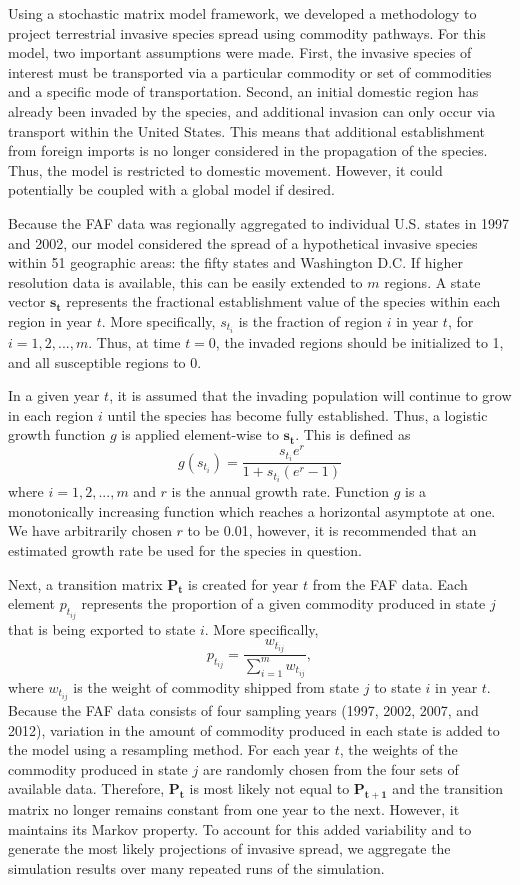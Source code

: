 \documentclass[12pt]{article}
\begin{document}
Using a stochastic matrix model framework, we developed a methodology to project terrestrial invasive species spread using commodity pathways.  For this model, two important assumptions were made.  First, the invasive species of interest must be transported via a particular commodity or set of commodities and a specific mode of transportation.  Second, an initial domestic region has already been invaded by the species, and additional invasion can only occur via transport within the United States.  This means that additional establishment from foreign imports is no longer considered in the propagation of the species.  Thus, the model is restricted to domestic movement. However, it could potentially be coupled with a global model if desired.

Because the FAF data was regionally aggregated to individual U.S. states in 1997 and 2002, our model considered the spread of a hypothetical invasive species within 51 geographic areas: the fifty states and Washington D.C.  If higher resolution data is available, this can be easily extended to $m$ regions.  A state vector $\boldsymbol{s_t}$ represents the fractional establishment value of the species within each region in year $t$.  More specifically, $s_{t_i}$ is the fraction of region $i$ in year $t$, for $i = 1,2,..., m$.  Thus, at time $t=0$, the invaded regions should be initialized to 1, and all susceptible regions to 0.    

In a given year $t$, it is assumed that the invading population will continue to grow in each region $i$ until the species has become fully established.  Thus, a logistic growth function $g$ is applied element-wise to $\boldsymbol{s_t}$.  This is defined as
\[ 
	g(s_{t_i}) = \frac{s_{t_i} e^r}{1+s_{t_i} (e^r-1)}
\]
where $i=1,2,...,m$ and $r$ is the annual growth rate. Function $g$ is a monotonically increasing function which reaches a horizontal asymptote at one. We have arbitrarily chosen $r$ to be 0.01, however, it is recommended that an estimated growth rate be used for the species in question.

Next, a transition matrix $\boldsymbol{P_t}$ is created for year $t$ from the FAF data.  Each element $p_{t_{ij}}$ represents the proportion of a given commodity produced in state $j$ that is being exported to state $i$.  More specifically, 
\[
p_{t_{ij}} = \frac{w_{t_{ij}}}{\sum_{i=1}^{m} w_{t_{ij}}},  
\]
where $w_{t_{ij}}$ is the weight of commodity shipped from state $j$ to state $i$ in year $t$.  Because the FAF data consists of four sampling years (1997, 2002, 2007, and 2012), variation in the amount of commodity produced in each state is added to the model using a resampling method.  For each year $t$, the weights of the commodity produced in state $j$ are randomly chosen from the four sets of available data.  Therefore, $\boldsymbol{P_t}$ is most likely not equal to $\boldsymbol{P_{t+1}}$ and the transition matrix no longer remains constant from one year to the next.  However, it maintains its Markov property.  To account for this added variability and to generate the most likely projections of invasive spread, we aggregate the simulation results over many repeated runs of the simulation.
\end{document}
